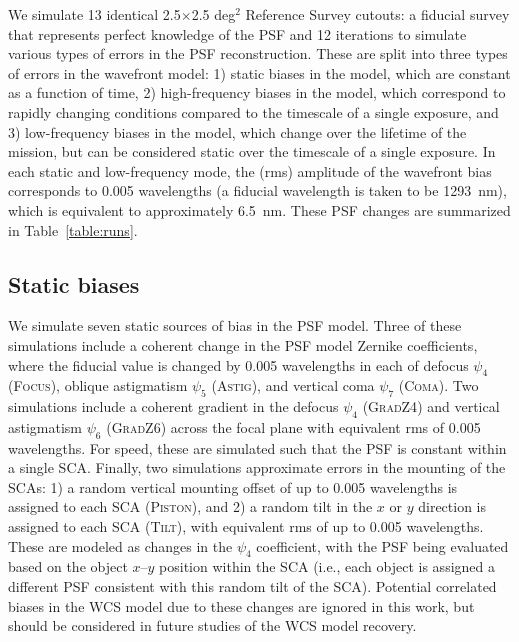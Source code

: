 \documentclass[usenatbib]{mnras}
\begin{document}
We simulate 13 identical 2.5$\times$2.5 deg$^2$ Reference Survey cutouts: a fiducial survey that represents perfect knowledge of the PSF and 12 iterations to simulate various types of errors in the PSF reconstruction. 
These are split into three types of errors in the wavefront model: 1) static biases in the model, which are constant as a function of time, 2) high-frequency biases in the model, which correspond to rapidly changing conditions compared to the timescale of a single exposure, and 3) low-frequency biases in the model, which change over the lifetime of the mission, but can be considered static over the timescale of a single exposure. 
In each static and low-frequency mode, the (rms) amplitude of the wavefront bias corresponds to 0.005 wavelengths (a fiducial wavelength is taken to be 1293~nm), which is equivalent to approximately 6.5~nm. These PSF changes are summarized in Table~\ref{table:runs}.

\subsection{Static biases}\label{sec:static}

We simulate seven static sources of bias in the PSF model. 
Three of these simulations include a coherent change in the PSF model Zernike coefficients, where the fiducial value is changed by 0.005 wavelengths in each of defocus $\psi_4$ (\textsc{Focus}), oblique astigmatism $\psi_5$ (\textsc{Astig}), and vertical coma $\psi_7$ (\textsc{Coma}). 
Two simulations include a coherent gradient in the defocus $\psi_4$ (\textsc{GradZ4}) and vertical astigmatism $\psi_6$ (\textsc{GradZ6}) across the focal plane with equivalent rms of 0.005 wavelengths. 
For speed, these are simulated such that the PSF is constant within a single SCA. Finally, two simulations approximate errors in the mounting of the SCAs: 1) a random vertical mounting offset of up to 0.005 wavelengths is assigned to each SCA (\textsc{Piston}), and 2) a random tilt in the $x$ or $y$ direction is assigned to each SCA  (\textsc{Tilt}), with equivalent rms of up to 0.005 wavelengths. 
These are modeled as changes in the $\psi_4$ coefficient, with the PSF being evaluated based on the object $x$--$y$ position within the SCA (i.e., each object is assigned a different PSF consistent with this random tilt of the SCA). 
Potential correlated biases in the WCS model due to these changes are ignored in this work, but should be considered in future studies of the WCS model recovery.
\end{document}
